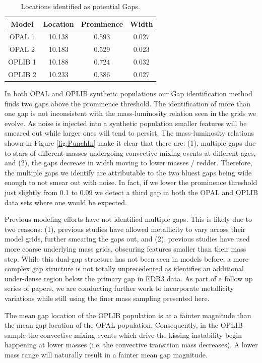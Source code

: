 \begin{table}
	\centering
	\begin{tabular}{c | c c c}
		\hline
		Model & Location & Prominence & Width\\
		\hline
		\hline
		OPAL 1 & 10.138 & 0.593 & 0.027 \\
		OPAL 2 & 10.183 & 0.529 & 0.023 \\
		OPLIB 1 & 10.188 & 0.724 & 0.032 \\
		OPLIB 2 & 10.233 & 0.386 & 0.027 
	\end{tabular}
	\caption{Locations identified as potential Gaps.}
	\label{tab:GapLocation}
\end{table}

In both OPAL and OPLIB synthetic populations our Gap identification method
finds two gaps above the prominence threshold. The identification of more than
one gap is not inconsistent with the mass-luminosity relation seen in the grids
we evolve. As noise is injected into a synthetic population smaller features will
be smeared out while larger ones will tend to persist. The mass-luminosity
relations shown in Figure \ref{fig:PunchIn} make it clear that there are: (1),
multiple gaps due to stars of different masses undergoing convective mixing
events at different ages, and (2), the gaps decrease in width moving to lower
masses / redder. Therefore, the multiple gaps we identify are attributable to
the two bluest gaps being wide enough to not smear out with noise. In fact, if
we lower the prominence threshold just slightly from 0.1 to 0.09 we detect a
third gap in both the OPAL and OPLIB data sets where one would be expected.

Previous modeling efforts \citep[e.g.][]{Feiden2021} have not identified
multiple gaps. This is likely due to two reasons: (1), previous studies have
allowed metallicity to vary across their model grids, further smearing the gaps
out, and (2), previous studies have used more coarse underlying mass grids,
obscuring features smaller than their mass step. While this dual-gap structure
has not been seen in models before, a more complex gap structure is not totally
unprecedented as \citet{Jao2021} identifies an additional under-dense region
below the primary gap in EDR3 data. As part of a follow up series of papers, we
are conducting further work to incorporate metallicity variations while still
using the finer mass sampling presented here.


The mean gap location of the OPLIB population is at a fainter magnitude than
the mean gap location of the OPAL population. Consequently, in the OPLIB sample
the convective mixing events which drive the kissing instability begin
happening at lower masses (i.e. the convective transition mass decreases). A
lower mass range will naturally result in a fainter mean gap magnitude.

